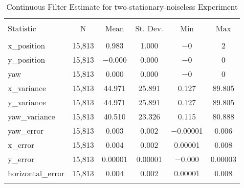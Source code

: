 
\begin{table}[h] \centering 
  \caption{Continuous Filter Estimate for two-stationary-noiseless Experiment} 
  \label{tab:two_stationary_noiseless_continuous_summary} 
\begin{tabular}{@{\extracolsep{5pt}}lccccc} 
\\[-1.8ex]\hline 
\hline \\[-1.8ex] 
Statistic & \multicolumn{1}{c}{N} & \multicolumn{1}{c}{Mean} & \multicolumn{1}{c}{St. Dev.} & \multicolumn{1}{c}{Min} & \multicolumn{1}{c}{Max} \\ 
\hline \\[-1.8ex] 
x\_position & 15,813 & 0.983 & 1.000 & $-$0 & 2 \\ 
y\_position & 15,813 & $-$0.000 & 0.000 & $-$0 & 0 \\ 
yaw & 15,813 & 0.000 & 0.000 & $-$0 & 0 \\ 
x\_variance & 15,813 & 44.971 & 25.891 & 0.127 & 89.805 \\ 
y\_variance & 15,813 & 44.971 & 25.891 & 0.127 & 89.805 \\ 
yaw\_variance & 15,813 & 40.510 & 23.326 & 0.115 & 80.888 \\ 
yaw\_error & 15,813 & 0.003 & 0.002 & $-$0.00001 & 0.006 \\ 
x\_error & 15,813 & 0.004 & 0.002 & 0.00001 & 0.008 \\ 
y\_error & 15,813 & 0.00001 & 0.00001 & $-$0.000 & 0.00003 \\ 
horizontal\_error & 15,813 & 0.004 & 0.002 & 0.00001 & 0.008 \\ 
\hline \\[-1.8ex] 
\end{tabular} 
\end{table} 
